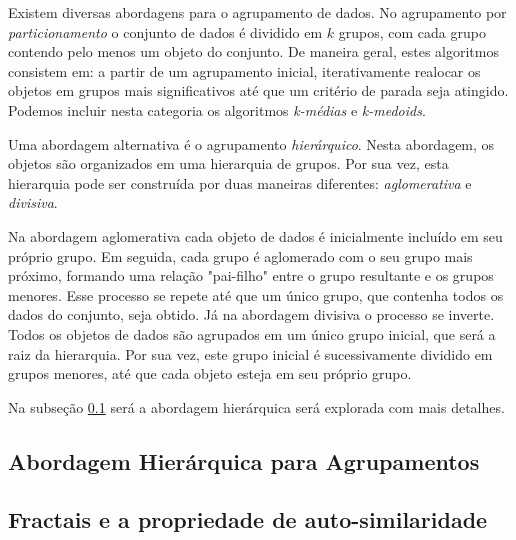 Existem diversas abordagens para o agrupamento de dados. No agrupamento por
\emph{particionamento} o conjunto de dados é dividido em $k$ grupos, com cada 
grupo contendo pelo menos um objeto do conjunto. De maneira geral, estes
algoritmos consistem em: a partir de um agrupamento inicial, iterativamente 
realocar os objetos em grupos mais significativos até que um critério de parada
seja atingido. Podemos incluir nesta categoria os algoritmos \emph{k-médias} e
\emph{k-medoids}.

Uma abordagem alternativa é o agrupamento \emph{hierárquico}. Nesta abordagem, 
os objetos são organizados em uma hierarquia de grupos. Por sua vez, esta
hierarquia pode ser construída por duas maneiras diferentes:
\emph{aglomerativa} e \emph{divisiva}.

Na abordagem aglomerativa cada objeto de dados é inicialmente incluído em seu
próprio grupo. Em seguida, cada grupo é aglomerado com o seu grupo mais próximo,
formando uma relação "pai-filho" entre o grupo resultante e os grupos menores.
Esse processo se repete até que um único grupo, que contenha todos os dados do 
conjunto, seja obtido. Já na abordagem divisiva o processo se inverte. Todos os
objetos de dados são agrupados em um único grupo inicial, que será a raiz da 
hierarquia. Por sua vez, este grupo inicial é sucessivamente dividido em grupos
menores, até que cada objeto esteja em seu próprio grupo.

Na subseção \ref{subsec:abordagem_hierarquica} será a abordagem hierárquica será
explorada com mais detalhes. 

\subsection{Abordagem Hierárquica para Agrupamentos}
	\label{subsec:abordagem_hierarquica}






\subsection{Fractais e a propriedade de auto-similaridade}
	\label{subsec:fractais}

